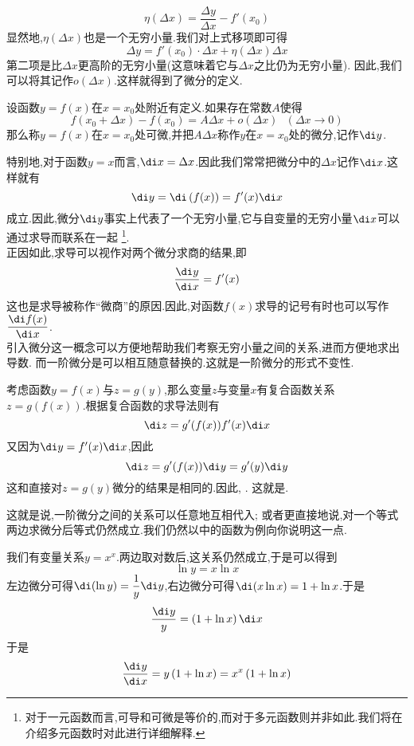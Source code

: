 \documentclass{ctexart}
\begin{document}
\[\eta(\Delta x)=\dfrac{\Delta y}{\Delta x}-f'\left(x_0\right)\]
显然地,$\eta(\Delta x)$也是一个无穷小量.我们对上式移项即可得
\[\Delta y=f'\left(x_0\right)\cdot\Delta x+\eta(\Delta x)\Delta x\]
第二项是比$\Delta x$更高阶的无穷小量(这意味着它与$\Delta x$之比仍为无穷小量).%
因此,我们可以将其记作$o(\Delta x)$.这样就得到了微分的定义.
\begin{definition}[0A.3.2 微分]
    设函数$y=f(x)$在$x=x_0$处附近有定义.如果存在常数$A$使得
    \[f\left(x_0+\Delta x\right)-f\left(x_0\right)=A\Delta x+o(\Delta x)\ \ \ (\Delta x\to0)\]
    那么称$y=f(x)$在$x=x_0$处可微,并把$A\Delta x$称作$y$在$x=x_0$处的微分,记作$\di y$.
\end{definition}
特别地,对于函数$y=x$而言,$\di x=\Delta x$.因此我们常常把微分中的$\Delta x$记作$\di x$.这样就有
\[\di y=\di\left(f(x)\right)=f'(x)\di x\]
成立.因此,微分$\di y$事实上代表了一个无穷小量,它与自变量的无穷小量$\di x$可以通过求导而联系在一起%
\footnote{对于一元函数而言,可导和可微是等价的,而对于多元函数则并非如此.我们将在介绍多元函数时对此进行详细解释.}.\\
\indent 正因如此,求导可以视作对两个微分求商的结果,即
\[\dfrac{\di y}{\di x}=f'(x)\]
这也是求导被称作“微商”的原因.因此,对函数$f(x)$求导的记号有时也可以写作$\dfrac{\di f(x)}{\di x}$.\vspace{4pt}\\
\indent 引入微分这一概念可以方便地帮助我们考察无穷小量之间的关系,进而方便地求出导数.%
而一阶微分是可以相互随意替换的.这就是一阶微分的形式不变性.
\begin{theorem}[0A.3.3 一阶微分的形式不变性]
    考虑函数$y=f(x)$与$z=g(y)$,那么变量$z$与变量$x$有复合函数关系$z=g(f(x))$.根据复合函数的求导法则有
    \[\di z=g'(f(x))f'(x)\di x\]
    又因为$\di y=f'(x)\di x$,因此
    \[\di z=g'(f(x))\di y=g'(y)\di y\]
    这和直接对$z=g(y)$微分的结果是相同的.因此,%
    .%
    这就是.
\end{theorem}
这就是说,一阶微分之间的关系可以任意地互相代入;%
或者更直接地说,对一个等式两边求微分后等式仍然成立.我们仍然以中的函数为例向你说明这一点.
\begin{solution}
    我们有变量关系$y=x^x$.两边取对数后,这关系仍然成立,于是可以得到
    \[\ln y=x\ln x\]
    左边微分可得$\di(\ln y)=\dfrac{1}{y}\di y$,右边微分可得$\di(x\ln x)=1+\ln x$.于是
    \[\dfrac{\di y}{y}=\left(1+\ln x\right)\di x\]
    于是
    \[\dfrac{\di y}{\di x}=y\left(1+\ln x\right)=x^x\left(1+\ln x\right)\]

\end{solution}
\end{document}
